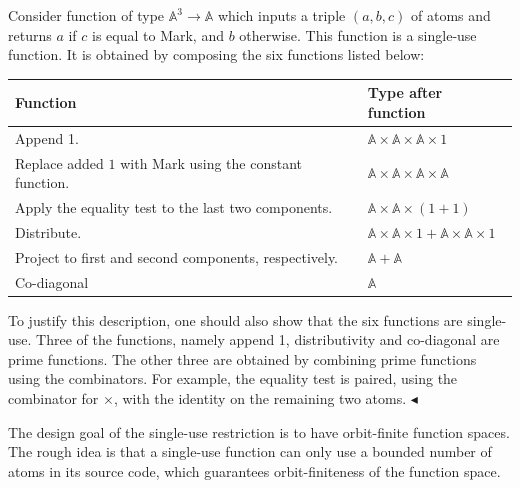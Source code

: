 \documentclass[10pt,a4paper]{amsart}
\numberwithin{equation}{section}
\theoremstyle{plain}
\newcommand{\atoms}{\mathbb A}
\newcommand{\exampleend}{$\blacktriangleleft$}
\begin{document}
\begin{example}\label{ex:six-compositions}
    Consider function of type $\atoms^3 \to \atoms$ which inputs a triple $(a,b,c)$ of atoms and returns $a$ if $c$ is equal to Mark, and $b$ otherwise. This function is a single-use function. It is obtained by composing the six functions listed below:
\begin{center}
    \begin{tabular}{ll}
        Function & Type after function \\
        \hline
        Append 1. & $ \atoms \times \atoms \times \atoms \times 1$ \\
        Replace added $1$ with Mark using the constant function. & $\atoms \times \atoms \times \atoms \times \atoms$ \\
        Apply the equality test to the last two components. & $ \atoms \times \atoms \times (1+1)$ \\
        Distribute. & $ \atoms \times \atoms \times 1 +   \atoms \times \atoms \times 1$ \\
        Project to first and second components, respectively. & $\atoms + \atoms$ \\
        Co-diagonal & $\atoms$ 
    \end{tabular}
\end{center}
To justify this description, one should also show that the six functions are single-use. Three of the functions, namely append 1, distributivity and co-diagonal are prime functions. The other three are obtained by combining prime functions using the combinators. For example, the equality test is paired, using the combinator for $\times$, with the identity on the remaining two atoms. \exampleend
\end{example}

The design goal of the single-use restriction is to have orbit-finite function spaces. The rough idea is that a single-use function can only use a bounded number of atoms in its source code, which guarantees orbit-finiteness of the function space. 
\end{document}
